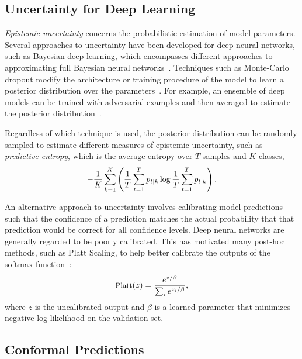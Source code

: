 \documentclass[letterpaper]{article} %
\begin{document}
    \subsection{Uncertainty for Deep Learning}
        \textit{Epistemic uncertainty} concerns the probabilistic estimation of model parameters.
        Several approaches to uncertainty have been developed for deep neural networks, such as Bayesian deep learning, which encompasses different approaches to approximating full Bayesian neural networks~\cite{Gal2016Uncertainty}.
        Techniques such as Monte-Carlo dropout modify the architecture or training procedure of the model to learn a posterior distribution over the parameters~\cite{pmlr-v48-gal16}.
        For example, an ensemble of deep models can be trained with adversarial examples and then averaged to estimate the posterior distribution~\cite{NIPS2017_9ef2ed4b}.

        Regardless of which technique is used, the posterior distribution can be randomly sampled to estimate different measures of epistemic uncertainty, such as \textit{predictive entropy}, which is the average entropy over $T$ samples and $K$ classes,
        \begin{equation}
            \label{eq:entropy}
            \small
                -\frac{1}{K} \sum_{k=1}^K \left(\frac{1}{T} \sum_{t=1}^T p_{t \mid k} \log \frac{1}{T} \sum_{t=1}^T p_{t \mid k}\right).
        \end{equation}


        An alternative approach to uncertainty involves calibrating model predictions such that the confidence of a prediction matches the actual probability that that prediction would be correct for all confidence levels.
        Deep neural networks are generally regarded to be poorly calibrated.
        This has motivated many post-hoc methods, such as Platt Scaling, to help better calibrate the outputs of the softmax function~\cite{pmlr-v70-guo17a}:
        \begin{equation}
            \label{eq:platt}
            \small
            \textrm{Platt}(z) = \frac{e^{z/\beta}}{\sum_i e^{z_i/\beta}},
        \end{equation}
        where $z$ is the uncalibrated output and $\beta$ is a learned parameter that minimizes negative log-likelihood on the validation set.

    \subsection{Conformal Predictions}
\end{document}
